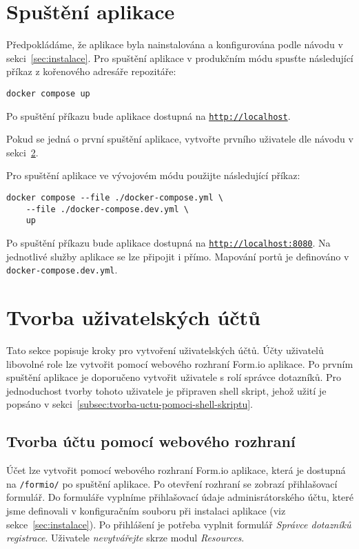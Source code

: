 \section{Spuštění aplikace}\label{sec:spusteni-aplikace}

Předpokládáme, že aplikace byla nainstalována a konfigurována podle návodu v sekci~\ref{sec:instalace}.
Pro spuštění aplikace v produkčním módu spusťte následující příkaz z kořenového adresáře repozitáře:

\begin{verbatim}
docker compose up
\end{verbatim}

Po spuštění příkazu bude aplikace dostupná na \texttt{\href{http://localhost}{http://localhost}}.

Pokud se jedná o první spuštění aplikace, vytvořte prvního uživatele dle návodu v sekci~\ref{sec:tvorba-uzivatelskych-uctu}.

Pro spuštění aplikace ve vývojovém módu použijte následující příkaz:

\begin{verbatim}
docker compose --file ./docker-compose.yml \
    --file ./docker-compose.dev.yml \
    up
\end{verbatim}

Po spuštění příkazu bude aplikace dostupná na \texttt{\href{http://localhost:8080}{http://localhost:8080}}.
Na jednotlivé služby aplikace se lze připojit i přímo.
Mapování portů je definováno v \texttt{docker-compose.dev.yml}.


\section{Tvorba uživatelských účtů}\label{sec:tvorba-uzivatelskych-uctu}

Tato sekce popisuje kroky pro vytvoření uživatelských účtů.
Účty uživatelů libovolné role lze vytvořit pomocí webového rozhraní Form.io aplikace.
Po prvním spuštění aplikace je doporučeno vytvořit uživatele s rolí správce dotazníků.
Pro jednoduchost tvorby tohoto uživatele je připraven shell skript, jehož užití je popsáno v sekci~\ref{subsec:tvorba-uctu-pomoci-shell-skriptu}.

\subsection{Tvorba účtu pomocí webového rozhraní}\label{subsec:tvorba-uctu-pomoci-weboveho-rozhrani}

Účet lze vytvořit pomocí webového rozhraní Form.io aplikace, která je dostupná na \texttt{/formio/} po spuštění aplikace.
Po otevření rozhraní se zobrazí přihlašovací formulář.
Do formuláře vyplníme přihlašovací údaje adminisrátorského účtu, které jsme definovali v konfiguračním souboru při instalaci aplikace (viz sekce~\ref{sec:instalace}).
Po přihlášení je potřeba vyplnit formulář \textit{Správce dotazníků registrace}.
Uživatele \textit{nevytvářejte} skrze modul \textit{Resources}.

